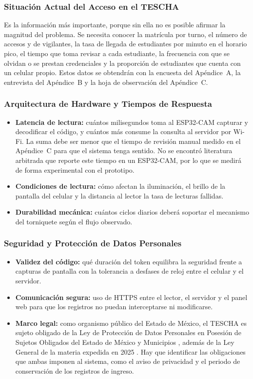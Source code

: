 \documentclass[stu,11pt,floatsintext,biblatex]{apa7}
\begin{document}
\subsubsection{Situación Actual del Acceso en el TESCHA}
Es la información más importante, porque sin ella no es posible afirmar la
magnitud del problema. Se necesita conocer la matrícula por turno, el número
de accesos y de vigilantes, la tasa de llegada de estudiantes por minuto en el
horario pico, el tiempo que toma revisar a cada estudiante, la frecuencia con
que se olvidan o se prestan credenciales y la proporción de estudiantes que
cuenta con un celular propio. Estos datos se obtendrán con la encuesta del
Apéndice~A, la entrevista del Apéndice~B y la hoja de observación del
Apéndice~C.

\subsubsection{Arquitectura de Hardware y Tiempos de Respuesta}
\begin{itemize}
  \item \textbf{Latencia de lectura:} cuántos milisegundos toma al ESP32-CAM
  capturar y decodificar el código, y cuántos más consume la consulta al
  servidor por Wi-Fi. La suma debe ser menor que el tiempo de revisión manual
  medido en el Apéndice~C para que el sistema tenga sentido. No se encontró
  literatura arbitrada que reporte este tiempo en un ESP32-CAM, por lo que se
  medirá de forma experimental con el prototipo.
  \item \textbf{Condiciones de lectura:} cómo afectan la iluminación, el
  brillo de la pantalla del celular y la distancia al lector la tasa de
  lecturas fallidas.
  \item \textbf{Durabilidad mecánica:} cuántos ciclos diarios deberá soportar
  el mecanismo del torniquete según el flujo observado.
\end{itemize}

\subsubsection{Seguridad y Protección de Datos Personales}
\begin{itemize}
  \item \textbf{Validez del código:} qué duración del token equilibra la
  seguridad frente a capturas de pantalla con la tolerancia a desfases de
  reloj entre el celular y el servidor.
  \item \textbf{Comunicación segura:} uso de HTTPS entre el lector, el
  servidor y el panel web para que los registros no puedan interceptarse ni
  modificarse.
  \item \textbf{Marco legal:} como organismo público del Estado de México, el
  TESCHA es sujeto obligado de la Ley de Protección de Datos Personales en
  Posesión de Sujetos Obligados del Estado de México y Municipios
  \parencite{edomex2017datos}, además de la Ley General de la materia
  expedida en 2025 \parencite{lgpdppso2025}. Hay que identificar las
  obligaciones que ambas imponen al sistema, como el aviso de privacidad y el
  periodo de conservación de los registros de ingreso.
\end{itemize}
\end{document}
